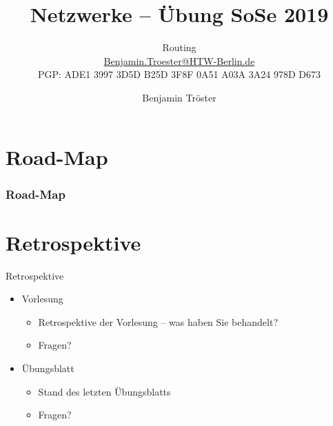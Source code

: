 \documentclass[xcolor=dvipsnames, aspectratio=169]{beamer}
\begin{document}

\title{Netzwerke -- Übung SoSe 2019}
\subtitle{Routing\\
		\href{mailto:Benjamin.Troester@HTW-Berlin.de}{Benjamin.Troester@HTW-Berlin.de}\\
		PGP: ADE1 3997 3D5D B25D 3F8F 0A51 A03A 3A24 978D D673 }
\author{Benjamin Tröster}

\date{}

\begin{frame}
\titlepage

\end{frame}

\section*{Road-Map}
\begin{frame}
\frametitle{Road-Map}
\begin{multicols}{2}
  \tableofcontents
\end{multicols}
\end{frame}

\section{Retrospektive}
\begin{frame}{Retrospektive}
\begin{itemize}
	\item Vorlesung
	\begin{itemize}
		\item Retrospektive der Vorlesung -- was haben Sie behandelt?
		\item Fragen?
	\end{itemize}
	\item Übungsblatt
	\begin{itemize}
		\item Stand des letzten Übungsblatts
		\item Fragen?
	\end{itemize}
\end{itemize}
\end{frame}
\end{document}

